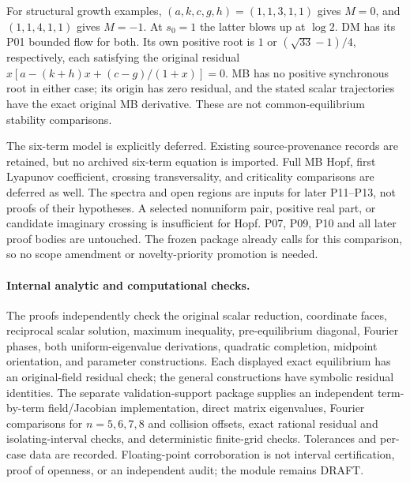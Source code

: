 For structural growth examples, $(a,k,c,g,h)=(1,1,3,1,1)$ gives
$M=0$, and $(1,1,4,1,1)$ gives $M=-1$. At $s_0=1$ the latter blows
up at $\log2$. DM has its P01 bounded flow for both. Its own positive
root is $1$ or $(\sqrt{33}-1)/4$, respectively, each satisfying the
original residual $x[a-(k+h)x+(c-g)/(1+x)]=0$.
MB has no positive synchronous root in either case; its origin has zero
residual, and the stated scalar trajectories have the exact original
MB derivative. These are not common-equilibrium stability comparisons.

\label{slot:P08-extra-1}
The six-term model is explicitly deferred. Existing source-provenance
records are retained, but no archived six-term equation is imported.
Full MB Hopf, first Lyapunov coefficient, crossing transversality, and
criticality comparisons are deferred as well. The spectra and open
regions are inputs for later P11--P13, not proofs of their hypotheses.
A selected nonuniform pair, positive real part, or candidate imaginary
crossing is insufficient for Hopf. P07, P09, P10 and all later proof
bodies are untouched. The frozen package already calls for this
comparison, so no scope amendment or novelty-priority promotion is needed.

\paragraph{Internal analytic and computational checks.}
The proofs independently check the original scalar reduction, coordinate
faces, reciprocal scalar solution, maximum inequality, pre-equilibrium
diagonal, Fourier phases, both uniform-eigenvalue derivations, quadratic
completion, midpoint orientation, and parameter constructions.
Each displayed exact equilibrium has an original-field residual check;
the general constructions have symbolic residual identities.
The separate validation-support package supplies an independent
term-by-term field/Jacobian implementation, direct matrix eigenvalues,
Fourier comparisons for $n=5,6,7,8$ and collision offsets, exact rational
residual and isolating-interval checks, and deterministic finite-grid
checks. Tolerances and per-case data are recorded. Floating-point
corroboration is not interval certification, proof of openness, or an
independent audit; the module remains DRAFT.

